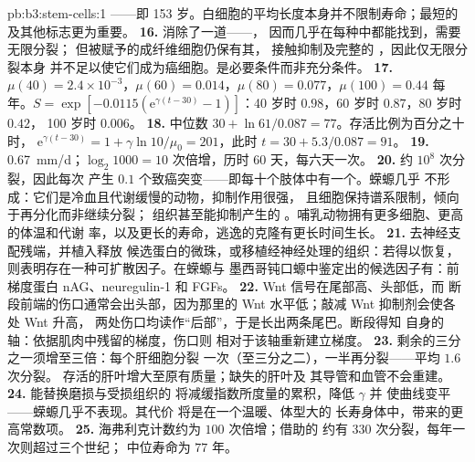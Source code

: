 \begin{solution}{pb:b3:stem-cells:1}
——即 153 岁。白细胞的平均长度本身并不限制寿命；最短的
及其他标志更为重要。
\textbf{16.} 消除了一道——，
因而几乎在每种中都能找到，需要无限分裂；
但被赋予的成纤维细胞仍保有其，
接触抑制及完整的 ，因此仅无限分裂本身
并不足以使它们成为癌细胞。是必要条件而非充分条件。
\textbf{17.} $\mu(40) = 2.4\times 10^{-3}$，$\mu(60) = 0.014$，$\mu(80) =
0.077$，$\mu(100) = 0.44$ 每年。$S = \exp[-0.0115(\mathrm{e}^{\gamma
(t-30)} - 1)]$：40 岁时 $0.98$，60 岁时 $0.87$，80 岁时 $0.42$，
100 岁时 $0.006$。
\textbf{18.} 中位数 $30 + \ln 61/0.087 = 77$。存活比例为百分之十时，
$\mathrm{e}^{\gamma(t-30)} = 1 + \gamma\ln 10/\mu_{0} = 201$，此时 $t = 30 +
5.3/0.087 = 91$。
\textbf{19.} \qty{0.67}{mm/d}；$\log_{2}1000 = 10$ 次倍增，历时 60
天，每六天一次。
\textbf{20.} 约 $10^{8}$ 次分裂，因此每次
产生 $0.1$ 个致癌突变——即每十个肢体中有一个。蝾螈几乎
不形成：它们是冷血且代谢缓慢的动物，抑制作用很强，
且细胞保持谱系限制，倾向于再分化而非继续分裂；
组织甚至能抑制产生的
。哺乳动物拥有更多细胞、更高的体温和代谢
率，以及更长的寿命，逃逸的克隆有更长时间生长。
\textbf{21.} 去神经支配残端，并植入释放
候选蛋白的微珠，或移植经神经处理的组织：若得以恢复，
则表明存在一种可扩散因子。在蝾螈与
墨西哥钝口螈中鉴定出的候选因子有：前梯度蛋白 nAG、neuregulin-1 和 FGFs。
\textbf{22.} Wnt 信号在尾部高、头部低，而
断段前端的伤口通常会出头部，因为那里的 Wnt
水平低；敲减 Wnt 抑制剂会使各处 Wnt 升高，
两处伤口均读作“后部”，于是长出两条尾巴。断段得知
自身的轴：依据肌肉中残留的梯度，伤口则
相对于该轴重新建立梯度。
\textbf{23.} 剩余的三分之一须增至三倍：每个肝细胞分裂
一次（至三分之二），一半再分裂——平均 $1.6$ 次分裂。
存活的肝叶增大至原有质量；缺失的肝叶及
其导管和血管不会重建。
\textbf{24.} 能替换磨损与受损组织的
将减缓指数所度量的累积，降低 $\gamma$ 并
使曲线变平——蝾螈几乎不表现。其代价
将是在一个温暖、体型大的
长寿身体中，带来的更高常数项。
\textbf{25.} 海弗利克计数约为 $100$ 次倍增；借助的
约有 $330$ 次分裂，每年一次则超过三个世纪；
中位寿命为 $77$ 年。
\end{solution}
